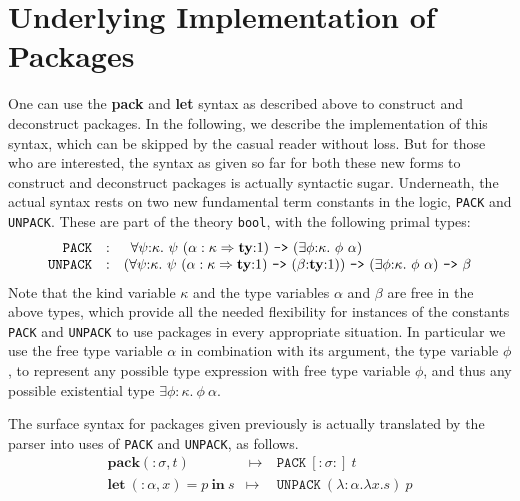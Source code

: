 \section{Underlying Implementation of Packages}

One can use the {\bf pack} and {\bf let} syntax as described above
to construct and deconstruct packages. In the following, we describe the
implementation of this syntax, which can be skipped by the casual reader without loss.
But for those who are interested, the syntax as given so far for both these new forms
to construct and deconstruct packages
is actually syntactic sugar. Underneath, the actual syntax rests on two new 
fundamental term constants in the \HOLW{} logic, {\tt PACK} and {\tt UNPACK}.
These are part of the theory {\tt bool}, with the following primal types:
$$
\begin{array}{rcl}
\mathtt{PACK} & : & \ \,\forall \psi{:}\kappa.\ 
                    \psi\ (\alpha : \kappa \Rightarrow \mathbf{ty}{:}1)
                    \ \mbox{\tt ->}\ 
                    (\exists \phi{:}\kappa.\ \phi\ \alpha) \\
\mathtt{UNPACK} & : & (\forall \psi{:}\kappa.\ 
                    \psi\ (\alpha : \kappa \Rightarrow \mathbf{ty}{:}1)
                    \ \mbox{\tt ->}\ 
                    (\beta {:}\mathbf{ty}{:}1))
                    \ \mbox{\tt ->}\ 
                    (\exists \phi{:}\kappa.\ \phi\ \alpha)
                    \ \mbox{\tt ->}\ 
                    \beta
\end{array}
$$
Note that the kind variable $\kappa$ and the type variables $\alpha$ and
$\beta$ are free in the above types, which provide all the needed flexibility
for instances of the constants {\tt PACK} and {\tt UNPACK}
to use packages in every appropriate situation.
In particular we use the 
free type variable $\alpha$
in combination with its argument, the type variable $\phi$,
to represent any possible type expression with free type variable $\phi$,
and thus any possible existential type $\exists \phi{:}\kappa.\ \phi\ \alpha$.

The 
surface syntax
for packages given previously is actually translated 
by the parser into
uses of {\tt PACK} and {\tt UNPACK}, as follows.
$$
\begin{array}{lcl}
\mathbf{pack}({:}\sigma, t) %
& \ \mapsto \ & \mathtt{PACK}\ [{:}\sigma{:}]\ t \\
\mathbf{let}\ ({:}\alpha,x) = p\ \mathbf{in}\ s
& \mapsto & \mathtt{UNPACK}\ (\lambda{:}\alpha. \lambda x. s)\ p
\end{array}
$$
